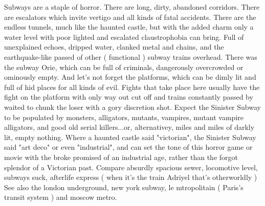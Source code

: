 \documentclass[12pt]{book}
\begin{document}
Subways are a staple of horror. There are long, dirty, abandoned corridors. There are escalators which invite vertigo and all kinds of fatal accidents. There are the endless tunnels, much like the haunted castle, but with the added charm only a water level with poor lighted and escalated claustrophobia can bring. Full of unexplained echoes, dripped water, clanked metal and chains, and the earthquake-like passed of other ( functional ) subway trains overhead. There was the subway Orie, which can be full of criminals, dangerously overcrowded or ominously empty. And let's not forget the platforms, which can be dimly lit and full of hid places for all kinds of evil. Fights that take place here usually have the fight on the platform with only way out cut off and trains constantly passed by waited to chunk the loser with a gory discretion shot. Expect the Sinister Subway to be populated by monsters, alligators, mutants, vampires, mutant vampire alligators, and good old serial killers...or, alternativey, miles and miles of darkly lit, empty nothing. Where a haunted castle said "victorian", the Sinister Subway said "art deco" or even "industrial", and can set the tone of this horror game or movie with the broke promised of an industrial age, rather than the forgot splendor of a Victorian past. Compare absurdly spacious sewer, locomotive level, subways suck, afterlife express ( when it's the train Adriyel that's otherworldly ) See also the london underground, new york subway, le mtropolitain ( Paris's transit system ) and moscow metro.
\end{document}

